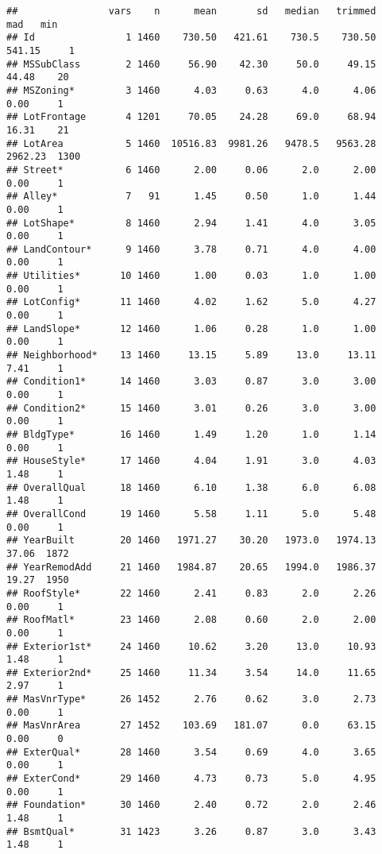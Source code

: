 \documentclass[
]{article}
\begin{document}
\begin{verbatim}
##                vars    n      mean       sd   median   trimmed      mad   min
## Id                1 1460    730.50   421.61    730.5    730.50   541.15     1
## MSSubClass        2 1460     56.90    42.30     50.0     49.15    44.48    20
## MSZoning*         3 1460      4.03     0.63      4.0      4.06     0.00     1
## LotFrontage       4 1201     70.05    24.28     69.0     68.94    16.31    21
## LotArea           5 1460  10516.83  9981.26   9478.5   9563.28  2962.23  1300
## Street*           6 1460      2.00     0.06      2.0      2.00     0.00     1
## Alley*            7   91      1.45     0.50      1.0      1.44     0.00     1
## LotShape*         8 1460      2.94     1.41      4.0      3.05     0.00     1
## LandContour*      9 1460      3.78     0.71      4.0      4.00     0.00     1
## Utilities*       10 1460      1.00     0.03      1.0      1.00     0.00     1
## LotConfig*       11 1460      4.02     1.62      5.0      4.27     0.00     1
## LandSlope*       12 1460      1.06     0.28      1.0      1.00     0.00     1
## Neighborhood*    13 1460     13.15     5.89     13.0     13.11     7.41     1
## Condition1*      14 1460      3.03     0.87      3.0      3.00     0.00     1
## Condition2*      15 1460      3.01     0.26      3.0      3.00     0.00     1
## BldgType*        16 1460      1.49     1.20      1.0      1.14     0.00     1
## HouseStyle*      17 1460      4.04     1.91      3.0      4.03     1.48     1
## OverallQual      18 1460      6.10     1.38      6.0      6.08     1.48     1
## OverallCond      19 1460      5.58     1.11      5.0      5.48     0.00     1
## YearBuilt        20 1460   1971.27    30.20   1973.0   1974.13    37.06  1872
## YearRemodAdd     21 1460   1984.87    20.65   1994.0   1986.37    19.27  1950
## RoofStyle*       22 1460      2.41     0.83      2.0      2.26     0.00     1
## RoofMatl*        23 1460      2.08     0.60      2.0      2.00     0.00     1
## Exterior1st*     24 1460     10.62     3.20     13.0     10.93     1.48     1
## Exterior2nd*     25 1460     11.34     3.54     14.0     11.65     2.97     1
## MasVnrType*      26 1452      2.76     0.62      3.0      2.73     0.00     1
## MasVnrArea       27 1452    103.69   181.07      0.0     63.15     0.00     0
## ExterQual*       28 1460      3.54     0.69      4.0      3.65     0.00     1
## ExterCond*       29 1460      4.73     0.73      5.0      4.95     0.00     1
## Foundation*      30 1460      2.40     0.72      2.0      2.46     1.48     1
## BsmtQual*        31 1423      3.26     0.87      3.0      3.43     1.48     1

\end{verbatim}
\end{document}
